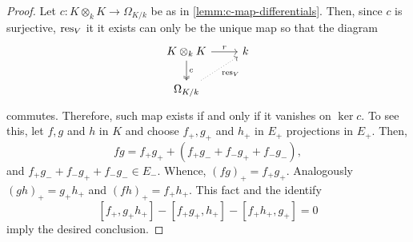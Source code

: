 \begin{proof}
	Let $c\colon K \otimes_{k} K \to \Omega_{K/k}$ be as in \cref{lemm:c-map-differentials}. Then, since $c$ is surjective, $\operatorname{res}_{V}$ it it exists can only be the unique map so that the diagram
	\[
	\begin{tikzcd}
		K \otimes_{k} K \arrow[r, "r"] \arrow[d, two heads, "c"] & k \\
		\Omega_{K/k} \arrow[ur, dotted, swap, "\res_{V}"] &
	\end{tikzcd}
	\]
	commutes. Therefore, such map exists if and only if it vanishes on $\ker c$. To see this, let $f,g$ and $h$ in $K$ and choose $f_{+}, g_{+}$ and $h_{+}$ in $E_{+}$ projections in $E_{+}$. Then,
	\[
		fg = f_{+}g_{+} + (f_{+}g_{-} + f_{-}g_{+} + f_{-}g_{-}),
	\]
	and $f_{+}g_{-} + f_{-}g_{+} + f_{-}g_{-} \in E_{-}$. Whence, $(fg)_{+} = f_{+}g_{+}$. Analogously $(gh)_{+} = g_{+}h_{+}$ and $(fh)_{+} = f_{+}h_{+}$. This fact and the identify
	\[
		[f_{+},g_{+}h_{+}] - [f_{+}g_{+}, h_{+}] - [f_{+}h_{+}, g_{+}] = 0
	\]
	imply the desired conclusion.
\end{proof}
